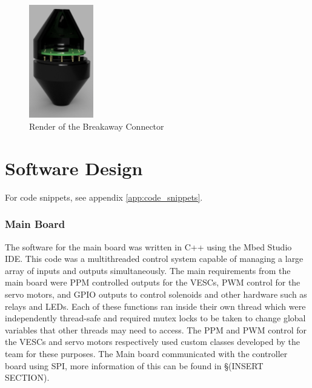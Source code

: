 \documentclass [12pt]{article}
\begin{document}
\begin{figure}[h]
    \centering
    \includegraphics[width=0.25\textwidth]{ConnectorRender.png}
    \caption{Render of the Breakaway Connector}
    \label{fig:connectorRender}
\end{figure}


\newpage
\section{Software Design} \label{sec:softwareDesign}

For code snippets, see appendix \ref{app:code_snippets}.
\subsubsection{Main Board}
The software for the main board was written in C++ using the Mbed Studio IDE. This code was a multithreaded control system capable of managing a large array of inputs and outputs simultaneously. The main requirements from the main board were PPM controlled outputs \cite{ppm} for the VESCs, PWM control for the servo motors, and GPIO outputs to control solenoids and other hardware such as relays and LEDs. Each of these functions ran inside their own thread which were independently thread-safe and required mutex locks to be taken to change global variables that other threads may need to access. The PPM and PWM control for the VESCs and servo motors respectively used custom classes developed by the team for these purposes. The Main board communicated with the controller board using SPI, more information of this can be found in §(INSERT SECTION).
\end{document}
